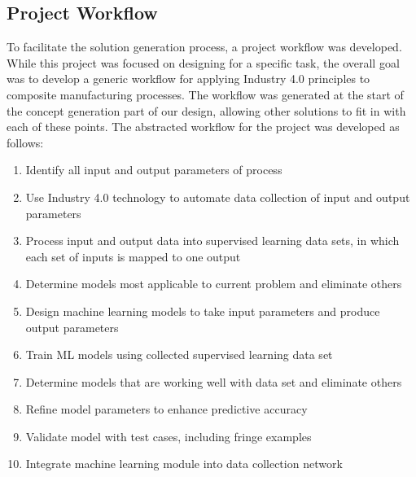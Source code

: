 \subsection{Project Workflow}
To facilitate the solution generation process, a project workflow was developed. While this project was focused on designing for a specific task, the overall goal was to develop a generic workflow for applying Industry 4.0 principles to composite manufacturing processes. The workflow was generated at the start of the concept generation part of our design, allowing other solutions to fit in with each of these points. The abstracted workflow for the project was developed as follows:
\begin{enumerate}
\item Identify all input and output parameters of process
\item Use Industry 4.0 technology to automate data collection of input and output parameters
\item Process input and output data into supervised learning data sets, in which each set of inputs is mapped to one output
\item Determine models most applicable to current problem and eliminate others 
\item Design machine learning models to take input parameters and produce output parameters
\item Train ML models using collected supervised learning data set
\item Determine models that are working well with data set and eliminate others
\item Refine model parameters to enhance predictive accuracy
\item Validate model with test cases, including fringe examples
\item Integrate machine learning module into data collection network
\end{enumerate}
